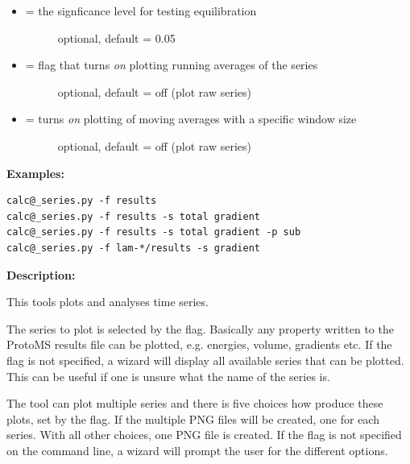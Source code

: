 \documentclass[letterpaper,10pt,english]{manual}
\begin{document}
\begin{itemize}
\item {} \begin{description}
\item[{ = the signficance level for testing equilibration}] \leavevmode
optional, default = 0.05

\end{description}

\item {} \begin{description}
\item[{ = flag that turns \emph{on} plotting running averages of the series}] \leavevmode
optional, default = off (plot raw series)

\end{description}

\item {} \begin{description}
\item[{ = turns \emph{on} plotting of moving averages with a specific window size}] \leavevmode
optional, default = off (plot raw series)

\end{description}

\end{itemize}

\textbf{Examples:}

\begin{Verbatim}[commandchars=@\[\]]
calc@_series.py -f results
calc@_series.py -f results -s total gradient
calc@_series.py -f results -s total gradient -p sub
calc@_series.py -f lam-*/results -s gradient
\end{Verbatim}

\textbf{Description:}

This tools plots and analyses time series.

The series to plot is selected by the  flag. Basically any property written to the ProtoMS results file can be plotted, e.g. energies, volume, gradients etc. If the  flag is not specified, a wizard will display all available series that can be plotted. This can be useful if one is unsure what the name of the series is.

The tool can plot multiple series and there is five choices how produce these plots, set by the  flag. If the  multiple PNG files will be created, one for each series. With all other choices, one PNG file is created. If the  flag is not specified on the command line, a wizard will prompt the user for the different options.
\end{document}
